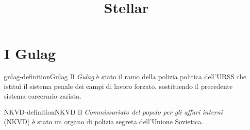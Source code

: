 \documentclass[preview]{standalone}
\begin{document}
\title{Stellar}
\genpage

\section{I Gulag}

\begin{snippetdefinition}{gulag-definition}{Gulag}
    Il \textit{Gulag} è stato il ramo della polizia politica dell'URSS
    che istituì il sistema penale dei campi di lavoro forzato,
    sostituendo il precedente sistema carcerario zarista.
\end{snippetdefinition}


\begin{snippetdefinition}{NKVD-definition}{NKVD}
    Il \textit{Commissariato del popolo per gli affari interni} (NKVD)
    è stato un organo di polizia segreta dell'Unione Sovietica.
\end{snippetdefinition}
\end{document}
